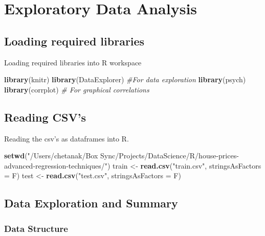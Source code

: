 \documentclass[]{article}
\newenvironment{Shaded}{\begin{snugshade}}{\end{snugshade}}
\newcommand{\KeywordTok}[1]{\textcolor[rgb]{0.13,0.29,0.53}{\textbf{#1}}}
\newcommand{\DataTypeTok}[1]{\textcolor[rgb]{0.13,0.29,0.53}{#1}}
\newcommand{\StringTok}[1]{\textcolor[rgb]{0.31,0.60,0.02}{#1}}
\newcommand{\CommentTok}[1]{\textcolor[rgb]{0.56,0.35,0.01}{\textit{#1}}}
\newcommand{\NormalTok}[1]{#1}
\begin{document}
\section{Exploratory Data Analysis}\label{exploratory-data-analysis}

\subsection{Loading required
libraries}\label{loading-required-libraries}

Loading required libraries into R workspace

\begin{Shaded}
\begin{Highlighting}[]
\KeywordTok{library}\NormalTok{(knitr)}
\KeywordTok{library}\NormalTok{(DataExplorer) }\CommentTok{#For data exploration }
\KeywordTok{library}\NormalTok{(psych)}
\KeywordTok{library}\NormalTok{(corrplot) }\CommentTok{# For graphical correlations}
\end{Highlighting}
\end{Shaded}

\subsection{Reading CSV's}\label{reading-csvs}

Reading the csv's as dataframes into R.

\begin{Shaded}
\begin{Highlighting}[]
\KeywordTok{setwd}\NormalTok{(}\StringTok{"/Users/chetanak/Box Sync/Projects/DataScience/R/house-prices-advanced-regression-techniques/"}\NormalTok{)}
\NormalTok{train <-}\StringTok{ }\KeywordTok{read.csv}\NormalTok{(}\StringTok{"train.csv"}\NormalTok{, }\DataTypeTok{stringsAsFactors =}\NormalTok{ F)}
\NormalTok{test <-}\StringTok{ }\KeywordTok{read.csv}\NormalTok{(}\StringTok{"test.csv"}\NormalTok{, }\DataTypeTok{stringsAsFactors =}\NormalTok{ F)}
\end{Highlighting}
\end{Shaded}

\subsection{Data Exploration and
Summary}\label{data-exploration-and-summary}

\subsubsection{Data Structure}\label{data-structure}
\end{document}
